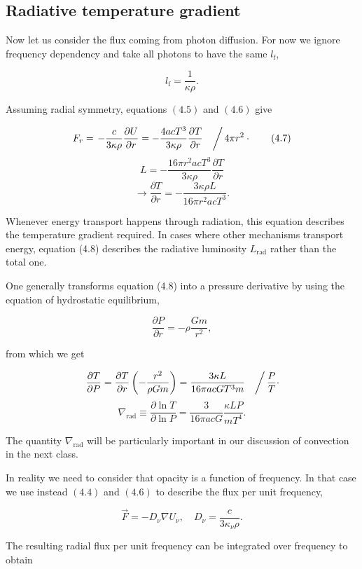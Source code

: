 \documentclass[twocolumn]{article}
\begin{document}
\hypertarget{radiative-temperature-gradient}{%
\subsection{Radiative temperature
gradient}\label{radiative-temperature-gradient}}

Now let us consider the flux coming from photon diffusion. For now we
ignore frequency dependency and take all photons to have the same
\(l_\mathrm{f}\),

\[l_\mathrm{f}=\frac{1}{\kappa\rho}.\]

Assuming radial symmetry, equations \((4.5)\) and \((4.6)\) give

\[F_r = \left.-\frac{c}{3\kappa\rho}\frac{\partial U}{\partial r} = -\frac{4acT^3}{3\kappa\rho}\frac{\partial T}{\partial r}\quad\right/4\pi r^2\cdot \tag{4.7}\]
\[L = -\frac{16 \pi r^2 acT^3}{3\kappa\rho}\frac{\partial T}{\partial r}\]
\[\rightarrow \boxed{\frac{\partial T}{\partial r}=-\frac{3\kappa \rho L}{16\pi r^2 a c T^3}}.\tag{4.8}\]

Whenever energy transport happens through radiation, this equation
describes the temperature gradient required. In cases where other
mechanisms transport energy, equation (4.8) describes the radiative
luminosity \(L_\mathrm{rad}\) rather than the total one.

One generally transforms equation (4.8) into a pressure derivative by
using the equation of hydrostatic equilibrium,

\[\frac{\partial P}{\partial r} = -\rho\frac{Gm}{r^2},\]

from which we get

\[\left.\frac{\partial T}{\partial P}=\frac{\partial T}{\partial r}\left(-\frac{r^2}{\rho G m}\right) = \frac{3\kappa L}{16\pi ac G T^3 m}\quad\right/ \frac{P}{T}\cdot\]
\[\boxed{\nabla_\mathrm{rad}\equiv\frac{\partial \ln T}{\partial \ln P}=\frac{3}{16\pi a c G}\frac{\kappa L P}{m T^4}}\tag{4.9}.\]

The quantity \(\nabla_\mathrm{rad}\) will be particularly important in
our discussion of convection in the next class.

In reality we need to consider that opacity is a function of frequency.
In that case we use instead \((4.4)\) and \((4.6)\) to describe the flux
per unit frequency,

\[\vec{F}=-D_\nu \nabla U_\nu,\quad D_\nu = \frac{c}{3\kappa_\nu \rho}.\]

The resulting radial flux per unit frequency can be integrated over
frequency to obtain
\end{document}
